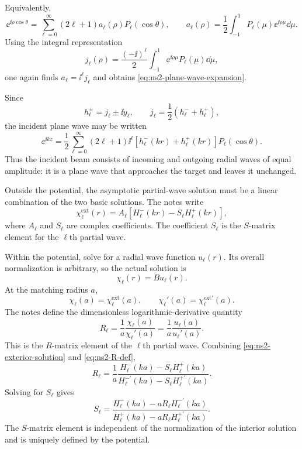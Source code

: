 Equivalently,
\[
  \ee^{\ii\rho\cos\theta}
  =\sum_{\ell=0}^{\infty}(2\ell+1)a_\ell(\rho)P_\ell(\cos\theta),
  \qquad
  a_\ell(\rho)=\frac12\int_{-1}^{1}P_\ell(\mu)\ee^{\ii\rho\mu}\dd\mu.
\]
Using the integral representation
\[
  j_\ell(\rho)=\frac{(-\ii)^\ell}{2}
  \int_{-1}^{1}\ee^{\ii\rho\mu}P_\ell(\mu)\dd\mu,
\]
one again finds $a_\ell=\ii^\ell j_\ell$ and obtains \eqref{eq:ns2-plane-wave-expansion}.

Since
\[
  h_\ell^\pm=j_\ell\pm\ii y_\ell,
  \qquad
  j_\ell=\frac12(h_\ell^-+h_\ell^+),
\]
the incident plane wave may be written
\[
  \ee^{\ii kz}
  =\frac12\sum_{\ell=0}^{\infty}(2\ell+1)\ii^\ell
  \left[h_\ell^-(kr)+h_\ell^+(kr)\right]P_\ell(\cos\theta).
\]
Thus the incident beam consists of incoming and outgoing radial waves of equal amplitude: it is a plane wave that approaches the target and leaves it unchanged.

Outside the potential, the asymptotic partial-wave solution must be a linear combination of the two basic solutions.  The notes write
\begin{equation}
  \chi_\ell^{\mathrm{ext}}(r)
  =A_\ell\left[H_\ell^-(kr)-S_\ell H_\ell^+(kr)\right],
  \label{eq:ns2-exterior-solution}
\end{equation}
where $A_\ell$ and $S_\ell$ are complex coefficients.  The coefficient $S_\ell$ is the $S$-matrix element for the $\ell$th partial wave.

Within the potential, solve for a radial wave function $u_\ell(r)$.  Its overall normalization is arbitrary, so the actual solution is
\[
  \chi_\ell(r)=B u_\ell(r).
\]
At the matching radius $a$,
\[
  \chi_\ell(a)=\chi_\ell^{\mathrm{ext}}(a),
  \qquad
  \chi_\ell'(a)=\chi_\ell^{\mathrm{ext}\prime}(a).
\]
The notes define the dimensionless logarithmic-derivative quantity
\begin{equation}
  R_\ell
  =\frac{1}{a}\frac{\chi_\ell(a)}{\chi_\ell'(a)}
  =\frac{1}{a}\frac{u_\ell(a)}{u_\ell'(a)}.
  \label{eq:ns2-R-def}
\end{equation}
This is the $R$-matrix element of the $\ell$th partial wave.  Combining \eqref{eq:ns2-exterior-solution} and \eqref{eq:ns2-R-def},
\[
  R_\ell
  =\frac{1}{a}
  \frac{H_\ell^-(ka)-S_\ell H_\ell^+(ka)}
  {H_\ell^{-\prime}(ka)-S_\ell H_\ell^{+\prime}(ka)}.
\]
Solving for $S_\ell$ gives
\begin{equation}
  S_\ell
  =\frac{H_\ell^-(ka)-aR_\ell H_\ell^{-\prime}(ka)}
  {H_\ell^+(ka)-aR_\ell H_\ell^{+\prime}(ka)}.
  \label{eq:ns2-S-from-R}
\end{equation}
The $S$-matrix element is independent of the normalization of the interior solution and is uniquely defined by the potential.


